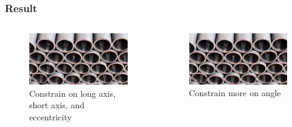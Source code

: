 \documentclass{beamer}
\begin{document}
\begin{frame}
    \frametitle{Result}


    \begin{columns}
        \begin{figure}
            \includegraphics[width=\textwidth]{abande.png}
            \caption{Constrain on long axis, short axis, and eccentricity}
        \end{figure}
        \begin{figure}
            \includegraphics[width=\textwidth]{moreonangle.png}
            \caption{Constrain more on angle}
        \end{figure}
    \end{columns}

    

\end{frame}
\end{document}
